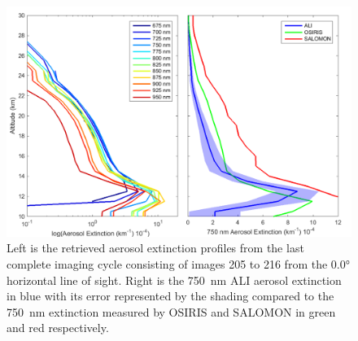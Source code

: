 \documentclass[12pt]{article}
\begin{document}
\clearpage

\begin{figure}
\includegraphics[width=1.0\textwidth]{./Images/5-3-FullAerosolCycleComparison.pdf}
    \caption{Left is the retrieved aerosol extinction profiles from the last complete imaging cycle consisting of images 205 to 216 from the 0.0\si{\degree} horizontal line of sight. Right is the 750~nm ALI aerosol extinction in blue with its error represented by the shading compared to the 750~nm extinction measured by OSIRIS and SALOMON in green and red respectively.}
    \label{fig:AliAerosolCycle}
\end{figure}

\clearpage
\end{document}
